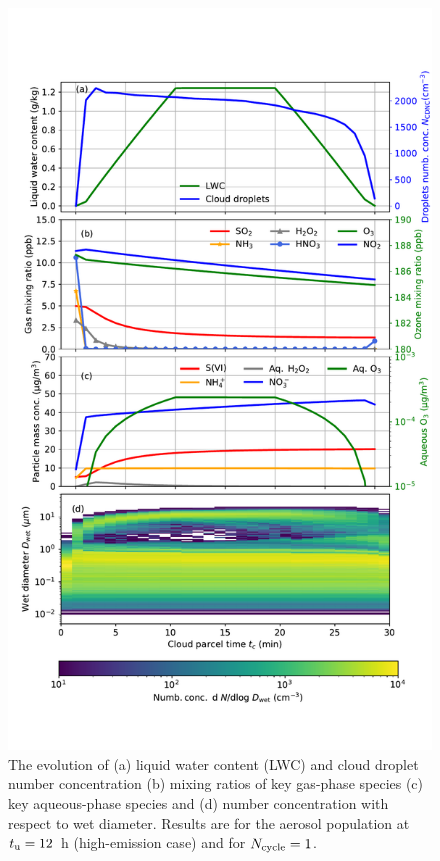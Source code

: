 \documentclass[edeposit,fullpage]{uiucthesis2009}
\begin{document}
\begin{figure}
    \centering
    \includegraphics[scale=0.50]{chap3_figs/fig4.pdf}
    \caption{The evolution of (a) liquid water content (LWC) and cloud
      droplet number concentration (b) mixing ratios of key gas-phase
      species (c) key aqueous-phase species and (d) number
      concentration with respect to wet diameter. Results are for the
      aerosol population at $t_{\rm u} =12$~h (high-emission
        case) and for $N_{\rm cycle}=1$.}
    \label{fig:cloud_env}
\end{figure}
\end{document}
